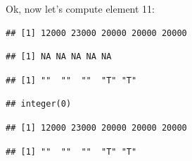 \documentclass[nojss]{jss}
\begin{document}
\begin{knitrout}
\color{fgcolor}\begin{kframe}
\begin{alltt}
 \hlkwb{=} \hlstd{nodes[processingLevel} \hlopt{==} \hlstd{, ]}
\end{alltt}
\end{kframe}
\end{knitrout}

Ok, now let's compute element 11:

\begin{knitrout}
\color{fgcolor}\begin{kframe}
\begin{alltt}
\end{alltt}
\begin{verbatim}
## [1] 12000 23000 20000 20000 20000
\end{verbatim}
\begin{alltt}
\end{alltt}
\begin{verbatim}
## [1] NA NA NA NA NA
\end{verbatim}
\begin{alltt}
\end{alltt}
\begin{verbatim}
## [1] ""  ""  ""  "T" "T"
\end{verbatim}
\begin{alltt}
\hlstd{(}   
\end{alltt}
\begin{verbatim}
## integer(0)
\end{verbatim}
\begin{alltt}
\end{alltt}
\begin{verbatim}
## [1] 12000 23000 20000 20000 20000
\end{verbatim}
\begin{alltt}
\end{alltt}
\begin{verbatim}
## [1] ""  ""  ""  "T" "T"
\end{verbatim}
\end{kframe}
\end{knitrout}
\end{document}
